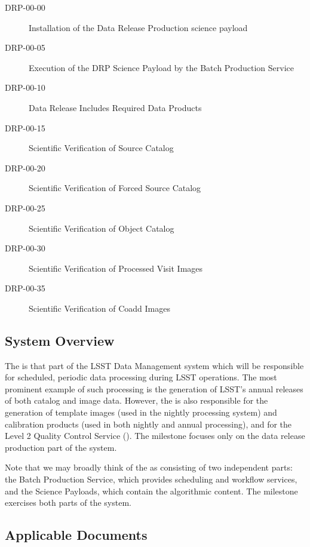 \documentclass[DM,lsstdraft,STR,toc]{lsstdoc}
\begin{document}
\begin{description}

  \item[DRP-00-00]{Installation of the Data Release Production science payload}
  \item[DRP-00-05]{Execution of the DRP Science Payload by the Batch Production Service}
  \item[DRP-00-10]{Data Release Includes Required Data Products}
  \item[DRP-00-15]{Scientific Verification of Source Catalog}
  \item[DRP-00-20]{Scientific Verification of Forced Source Catalog}
  \item[DRP-00-25]{Scientific Verification of Object Catalog}
  \item[DRP-00-30]{Scientific Verification of Processed Visit Images}
  \item[DRP-00-35]{Scientific Verification of Coadd Images}

\end{description}

\subsection{System Overview}
\label{sect:systemoverview}

The \product{} is that part of the LSST Data Management system which will be responsible for scheduled, periodic data processing during LSST operations.
The most prominent example of such processing is the generation of LSST's annual releases of both catalog and image data.
However, the \product{} is also responsible for the generation of template images (used in the nightly processing system) and calibration products (used in both nightly and annual processing), and for the Level 2 Quality Control Service ().
The \milestoneId{} milestone focuses only on the data release production part of the system.

Note that we may broadly think of the \product{} as consisting of two independent parts: the Batch Production Service, which provides scheduling and workflow services, and the Science Payloads, which contain the algorithmic content.
The \milestoneId{} milestone exercises both parts of the system.

\subsection{Applicable Documents}
\label{sect:appdocs}
\addtocounter{table}{-1}
\end{document}
